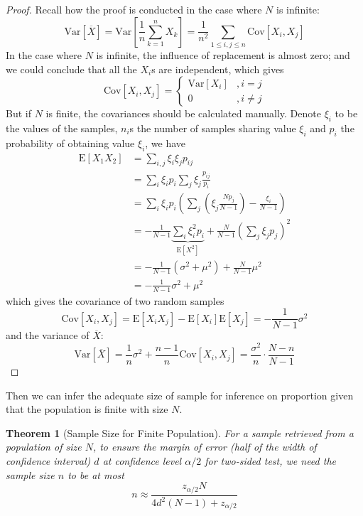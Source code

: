 \documentclass{article}
\newtheorem{theorem}{Theorem}[section]
\def\Cov{\mathrm{Cov}}
\def\E{\mathrm{E}}
\def\Var{\mathrm{Var}}
\begin{document}
\begin{proof}
    Recall how the proof is conducted in the case where $N$ is infinite:
    $$
    \Var[\overline{X}] = \Var\left[\frac{1}{n}\sum\limits_{k=1}^n X_k\right] = \dfrac{1}{n^2} \sum_{1\leq i,j\leq n}\Cov[X_i, X_j]
    $$
    In the case where $N$ is infinite, the influence of replacement is almost zero; and we could conclude that all the $X_i$s are independent, which gives 
    $$
    \Cov[X_i, X_j] = \begin{cases}
        \Var[X_i] &, i = j\\
        0 &, i\neq j 
    \end{cases}
    $$
    But if $N$ is finite, the covariances should be calculated manually. Denote $\xi_i$ to be the values of the samples, $n_i$s the number of samples sharing value $\xi_i$ and $p_i$ the probability of obtaining value $\xi_i$, we have
    \begin{align*}
        \E[X_1 X_2] & = \sum\limits_{i, j}\xi_i \xi_j p_{ij} \\
                    & = \sum\limits_{i}\xi_i p_i \sum\limits_{j} \xi_j \frac{p_{ij}}{p_i} \\
                    & = \sum\limits_{i}\xi_i p_i \left(\sum\limits_{j}\left(\xi_j\frac{N p_j}{N-1}\right) - \frac{\xi_i}{N-1} \right) \\ 
                    & = -\frac{1}{N-1}\underset{\E[X^2]}{\underbrace{\sum\limits_{i}\xi_i^2 p_i}} + \frac{N}{N-1}\left(\sum\limits_{j}\xi_j p_j\right)^2 \\
                    & = -\frac{1}{N-1}\left(\sigma^2 + \mu^2\right) + \frac{N}{N-1}\mu^2 \\
                    & = -\frac{1}{N-1}\sigma^2 + \mu^2
    \end{align*}
    which gives the covariance of two random samples
    $$
    \Cov[X_i, X_j] = \E[X_i X_j] - \E[X_i]\E[X_j] = -\frac{1}{N-1}\sigma^2
    $$
    and the variance of $\overline{X}$:
    $$
    \Var[\overline{X}] = \frac{1}{n}\sigma^2 + \frac{n-1}{n}\Cov[X_i, X_j] = \dfrac{\sigma^2}{n}\cdot\dfrac{N-n}{N-1}
    $$
\end{proof}

Then we can infer the adequate size of sample for inference on proportion given that the population is finite with size $N$. 

\begin{theorem}[Sample Size for Finite Population]
    For a sample retrieved from a population of size $N$, to ensure the margin of error (half of the width of confidence interval) $d$ at confidence level $\alpha/2$ for two-sided test, we need the sample size $n$ to be at most
    \begin{equation}\label{ssfinite}
    n\approx \dfrac{z_{\alpha/2}N}{4d^2(N-1)+z_{\alpha/2}}
    \end{equation}
\end{theorem}
\end{document}
